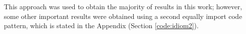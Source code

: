 This approach was used to obtain the majority of results in this work; however, some other important results were obtained using a second equally import code pattern, which is stated in the Appendix (Section \ref{code:idiom2}).

%
%





